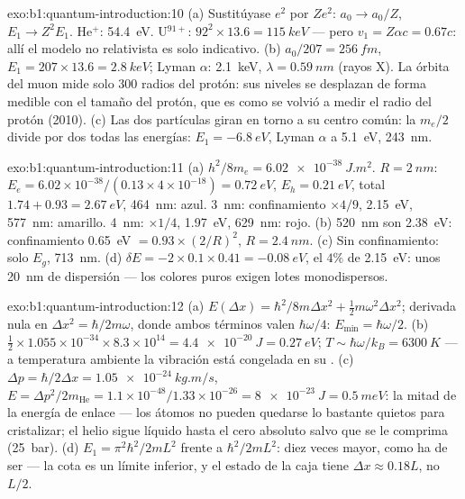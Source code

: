 \begin{solution}{exo:b1:quantum-introduction:10}
(a) Sustitúyase $e^2$ por $Ze^2$: $a_0 \to a_0/Z$, $E_1 \to Z^2E_1$. He$^+$:
\qty{54.4}{eV}. U$^{91+}$: $92^2 \times 13.6 = \qty{115}{keV}$ --- pero $v_1 = Z\alpha c
= 0.67c$: allí el modelo no relativista es solo indicativo. (b) $a_0/207
= \qty{256}{fm}$, $E_1 = 207 \times 13.6 = \qty{2.8}{keV}$; Lyman $\alpha$:
\qty{2.1}{keV}, $\lambda = \qty{0.59}{nm}$ (rayos X). La órbita del muon mide solo
$300$ radios del protón: sus niveles se desplazan de forma medible con el
tamaño del protón, que es como se volvió a medir el radio del protón (2010). (c) Las dos
partículas giran en torno a su centro común: la  $m_e/2$ divide
por dos todas las energías: $E_1 = \qty{-6.8}{eV}$, Lyman $\alpha$ a \qty{5.1}{eV}, \qty{243}{nm}.
\end{solution}

\begin{solution}{exo:b1:quantum-introduction:11}
(a) $h^2/8m_e = \qty{6.02e-38}{J.m^2}$. $R = \qty{2}{nm}$: $E_e = 6.02 \times 10^{-38}/
(0.13 \times 4 \times 10^{-18}) = \qty{0.72}{eV}$, $E_h = \qty{0.21}{eV}$, total $1.74 +
0.93 = \qty{2.67}{eV}$, \qty{464}{nm}: azul. \qty{3}{nm}: confinamiento $\times4/9$,
\qty{2.15}{eV}, \qty{577}{nm}: amarillo. \qty{4}{nm}: $\times1/4$, \qty{1.97}{eV},
\qty{629}{nm}: rojo. (b) \qty{520}{nm} son \qty{2.38}{eV}: confinamiento \qty{0.65}{eV}
$= 0.93 \times (2/R)^2$, $R = \qty{2.4}{nm}$. (c) Sin confinamiento: solo $E_g$,
\qty{713}{nm}. (d) $\delta E = -2 \times 0.1 \times 0.41 = \qty{-0.08}{eV}$, el $4\%$ de
\qty{2.15}{eV}: unos \qty{20}{nm} de dispersión --- los colores puros exigen
lotes monodispersos.
\end{solution}

\begin{solution}{exo:b1:quantum-introduction:12}
(a) $E(\Delta x) = \hbar^2/8m\Delta x^2 + \tfrac12m\omega^2\Delta x^2$; derivada nula en
$\Delta x^2 = \hbar/2m\omega$, donde ambos términos valen $\hbar\omega/4$: $E_{\min} =
\hbar\omega/2$. (b) $\tfrac12 \times 1.055 \times 10^{-34} \times 8.3 \times 10^{14} = \qty{4.4e-20}{J}
= \qty{0.27}{eV}$; $T \sim \hbar\omega/k_B = \qty{6300}{K}$ --- a temperatura ambiente
la vibración está congelada en su . (c) $\Delta p = \hbar/2\Delta x =
\qty{1.05e-24}{kg.m/s}$, $E = \Delta p^2/2m_{\mathrm{He}} = 1.1 \times 10^{-48}/1.33 \times
10^{-26} = \qty{8e-23}{J} = \qty{0.5}{meV}$: la mitad de la energía de enlace --- los átomos no
pueden quedarse lo bastante quietos para cristalizar; el helio sigue líquido hasta el cero
absoluto salvo que se le comprima (\qty{25}{bar}). (d) $E_1 = \pi^2\hbar^2/2mL^2$ frente a
$\hbar^2/2mL^2$: diez veces mayor, como ha de ser --- la cota es un límite
inferior, y el estado de la caja tiene $\Delta x \approx 0.18L$, no $L/2$.
\end{solution}

